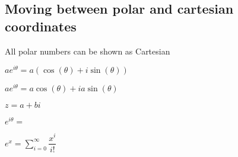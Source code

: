 
\subsection{Moving between polar and cartesian coordinates}

All polar numbers can be shown as Cartesian

\(ae^{i\theta }=a(\cos(\theta )+i\sin(\theta ))\)

\(ae^{i\theta }=a\cos(\theta )+ia\sin(\theta )\)

\(z=a+bi\)

\(e^{i\theta }=\)

\(e^x=\sum^{\infty }_{i=0} \dfrac{x^i}{i!}\)

